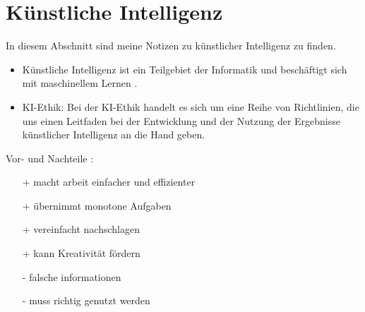 \section{Künstliche Intelligenz}
\label{sec:ai}

In diesem Abschnitt sind meine Notizen zu künstlicher Intelligenz zu finden.

\begin{itemize}
    \item Künstliche Intelligenz ist ein Teilgebiet der Informatik und beschäftigt sich mit maschinellem Lernen \citep{ai-wikipedia}.
    \item KI-Ethik: Bei der KI-Ethik handelt es sich um eine Reihe von Richtlinien, die uns einen Leitfaden bei der Entwicklung und der Nutzung der Ergebnisse künstlicher Intelligenz an die Hand geben. \citep{ibm}
\end{itemize}

Vor- und Nachteile \citep{GitHub}:
\begin{itemize}
    \item[+] macht arbeit einfacher und effizienter
    \item[+] übernimmt monotone Aufgaben
    \item[+] vereinfacht nachschlagen
    \item[+] kann Kreativität fördern
    \item[-] falsche informationen
    \item[-] muss richtig genutzt werden
\end{itemize}